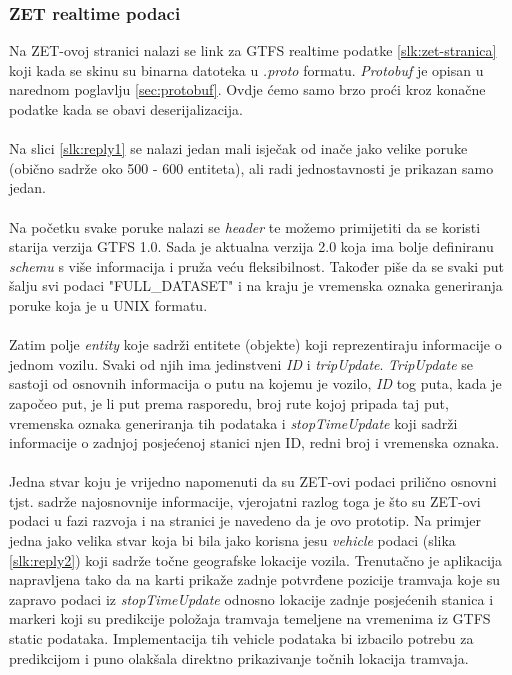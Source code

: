 \documentclass[zavrsnirad]{fer}
\begin{document}
\subsubsection{ZET realtime podaci}
Na ZET-ovoj stranici nalazi se link za GTFS realtime podatke \ref{slk:zet-stranica} koji kada se skinu su binarna datoteka u \textit{.proto} formatu. \textit{Protobuf} je opisan u narednom poglavlju \ref{sec:protobuf}. Ovdje ćemo samo brzo proći kroz konačne podatke kada se obavi deserijalizacija.\\\\
Na slici \ref{slk:reply1} se nalazi jedan mali isječak od inače jako velike poruke (obično sadrže oko 500 - 600 entiteta), ali radi jednostavnosti je prikazan samo jedan.\\\\
Na početku svake poruke nalazi se \textit{header} te možemo primijetiti da se koristi starija verzija GTFS 1.0. Sada je aktualna verzija 2.0 koja ima bolje definiranu \textit{schemu} s više informacija i pruža veću fleksibilnost. Također piše da se svaki put šalju svi podaci "FULL\_DATASET" i na kraju je vremenska oznaka generiranja poruke koja je u UNIX formatu.\\\\
Zatim polje \textit{entity} koje sadrži entitete (objekte) koji reprezentiraju informacije o jednom vozilu. Svaki od njih ima jedinstveni \textit{ID} i \textit{tripUpdate}. \textit{TripUpdate} se sastoji od osnovnih informacija o putu na kojemu je vozilo, \textit{ID} tog puta, kada je započeo put, je li put prema rasporedu, broj rute kojoj pripada taj put, vremenska oznaka generiranja tih podataka i \textit{stopTimeUpdate} koji sadrži informacije o zadnjoj posjećenoj stanici njen ID, redni broj i vremenska oznaka.\\\\
Jedna stvar koju je vrijedno napomenuti da su ZET-ovi podaci prilično osnovni tjst. sadrže najosnovnije informacije, vjerojatni razlog toga je što su ZET-ovi podaci u fazi razvoja i na stranici je navedeno da je ovo prototip. Na primjer jedna jako velika stvar koja bi bila jako korisna jesu \textit{vehicle} podaci (slika \ref{slk:reply2}) koji sadrže točne geografske lokacije vozila. Trenutačno je aplikacija napravljena tako da na karti prikaže zadnje potvrđene pozicije tramvaja koje su zapravo podaci iz \textit{stopTimeUpdate} odnosno lokacije zadnje posjećenih stanica i markeri koji su predikcije položaja tramvaja temeljene na vremenima iz GTFS static podataka. Implementacija tih vehicle podataka bi izbacilo potrebu za predikcijom i puno olakšala direktno prikazivanje točnih lokacija tramvaja.
\end{document}
